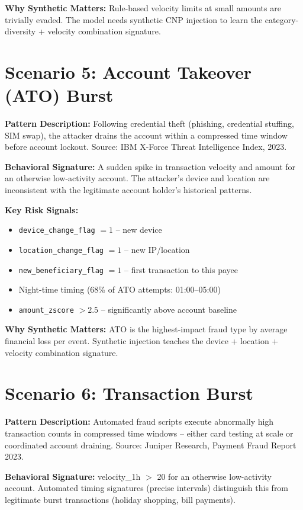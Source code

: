 \documentclass[12pt,a4paper,oneside]{book}
\begin{document}
\textbf{Why Synthetic Matters:} Rule-based velocity limits at small amounts are trivially evaded. The model needs synthetic CNP injection to learn the category-diversity + velocity combination signature.

\section{Scenario 5: Account Takeover (ATO) Burst}

\textbf{Pattern Description:} Following credential theft (phishing, credential stuffing, SIM swap), the attacker drains the account within a compressed time window before account lockout. Source: IBM X-Force Threat Intelligence Index, 2023.

\textbf{Behavioral Signature:} A sudden spike in transaction velocity and amount for an otherwise low-activity account. The attacker's device and location are inconsistent with the legitimate account holder's historical patterns.

\textbf{Key Risk Signals:}
\begin{itemize}
    \item \texttt{device\_change\_flag} $= 1$ -- new device
    \item \texttt{location\_change\_flag} $= 1$ -- new IP/location
    \item \texttt{new\_beneficiary\_flag} $= 1$ -- first transaction to this payee
    \item Night-time timing (68\% of ATO attempts: 01:00--05:00)
    \item \texttt{amount\_zscore} $> 2.5$ -- significantly above account baseline
\end{itemize}

\textbf{Why Synthetic Matters:} ATO is the highest-impact fraud type by average financial loss per event. Synthetic injection teaches the device + location + velocity combination signature.

\section{Scenario 6: Transaction Burst}

\textbf{Pattern Description:} Automated fraud scripts execute abnormally high transaction counts in compressed time windows -- either card testing at scale or coordinated account draining. Source: Juniper Research, Payment Fraud Report 2023.

\textbf{Behavioral Signature:} velocity\_1h $>$ 20 for an otherwise low-activity account. Automated timing signatures (precise intervals) distinguish this from legitimate burst transactions (holiday shopping, bill payments).
\end{document}
